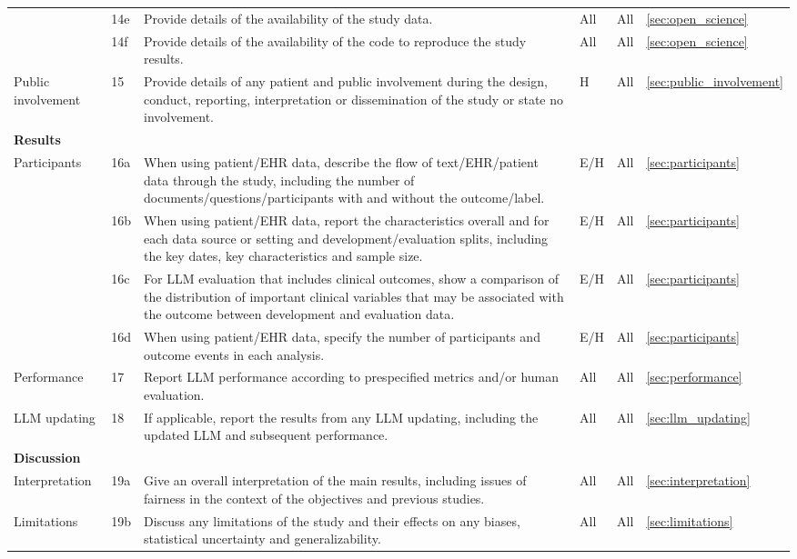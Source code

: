 \documentclass{article}
\begin{document}
\begin{longtable}{p{} l p{} l p{} l }
    & 14e & Provide details of the availability of the study data. & All & All & \ref{sec:open_science}  \\
    & 14f & Provide details of the availability of the code to reproduce the study results. & All & All & \ref{sec:open_science}  \\
    Public involvement & 15 & Provide details of any patient and public involvement during the design, conduct, reporting, interpretation or dissemination of the study or state no involvement. & H & All & \ref{sec:public_involvement} \\
    \multicolumn{3}{l}{\textbf{Results}} \\
    \multirow{4}{4em}{Participants} & 16a & When using patient/EHR data, describe the flow of text/EHR/patient data through the study, including the number of documents/questions/participants with and without the outcome/label. & E/H & All & \ref{sec:participants} \\
    & 16b & When using patient/EHR data, report the characteristics overall and for each data source or setting and development/evaluation splits, including the key dates, key characteristics and sample size. & E/H & All & \ref{sec:participants} \\
    & 16c & For LLM evaluation that includes clinical outcomes, show a comparison of the distribution of important clinical variables that may be associated with the outcome between development and evaluation data. & E/H & All & \ref{sec:participants} \\
    & 16d & When using patient/EHR data, specify the number of participants and outcome events in each analysis. & E/H & All & \ref{sec:participants} \\
    Performance & 17 & Report LLM performance according to prespecified metrics and/or human evaluation. & All & All & \ref{sec:performance} \\
    LLM updating & 18 & If applicable, report the results from any LLM updating, including the updated LLM and subsequent performance. & All & All & \ref{sec:llm_updating} \\
    \multicolumn{3}{l}{\textbf{Discussion}} \\
    Interpretation & 19a & Give an overall interpretation of the main results, including issues of fairness in the context of the objectives and previous studies. & All & All & \ref{sec:interpretation} \\
    Limitations & 19b & Discuss any limitations of the study and their effects on any biases, statistical uncertainty and generalizability. & All & All & \ref{sec:limitations} \\

\end{longtable}
\end{document}
